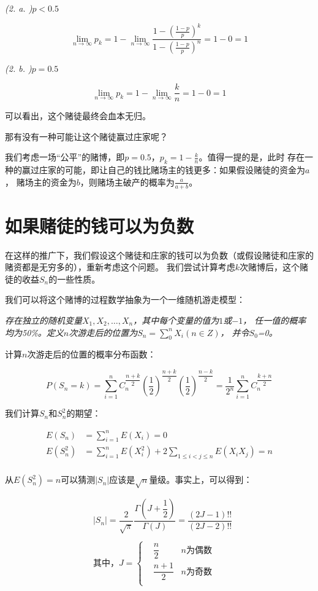 \documentclass{article}
\newcommand\df[2]{\dfrac{#1}{#2}}
\begin{document}
\emph{(2. a. )$p<0.5$}

\emph{$$\lim_{n\to\infty}p_k=1-\lim_{n\to\infty}\frac{1-(\frac{1-p}{p})^k}{1-(\frac{1-p}{p})^n}=1-0=1$$}

\emph{(2. b. )$p=0.5$}

\emph{$$\lim_{n\to\infty}p_k=1-\lim_{n\to\infty}\frac{k}{n}=1-0=1$$}

可以看出，这个赌徒最终会血本无归。

那有没有一种可能让这个赌徒赢过庄家呢？

我们考虑一场“公平”的赌博，即$p=0.5$，$p_k=1-\frac{k}{n}$。值得一提的是，此时
存在一种的赢过庄家的可能，即让自己的钱比赌场主的钱更多：如果假设赌徒的资金为$a$，
赌场主的资金为$b$，则赌场主破产的概率为$\frac{a}{a+b}$。\cite{WikiRW}

\section{如果赌徒的钱可以为负数}

在这样的推广下，我们假设这个赌徒和庄家的钱可以为负数（或假设赌徒和庄家的赌资都是无穷多的），重新考虑这个问题。
我们尝试计算考虑$k$次赌博后，这个赌徒的收益$S_n$的一些性质。

我们可以将这个赌博的过程数学抽象为一个一维随机游走模型：

\emph{存在独立的随机变量$X_1,X_2,\dots,X_n$，其中每个变量的值为$1$或$-1$，
任一值的概率均为50\%。定义$n$次游走后的位置为$S_n=\sum_{0}^{n}X_i(n\in Z)$，
并令$S_0$=0。}

计算$n$次游走后的位置的概率分布函数：

$$P(S_n=k)=\sum_{i=1}^{n}C_{n}^{\df{n+k}{2}}\left(\df{1}{2}\right)^{\df{n+k}{2}}\left(\df{1}{2}\right)^{\df{n-k}{2}}=\df{1}{2^n}\sum_{i=1}^{n}C_{n}^{\df{k+n}{2}}$$

我们计算$S_n$和$S_n^2$的期望：

\begin{equation*}
    \begin{aligned}
        E(S_n) & =\sum_{i=1}^{n}E(X_i)=0\\
        E(S_n^2) & =\sum_{i=1}^{n}E(X_i^2)+2\sum_{1\leq i<j\leq n}^{}E(X_iX_j)=n\\
    \end{aligned}
\end{equation*}

从$E(S_n^2)=n$可以猜测$|S_n|$应该是$\sqrt{n}$量级。事实上，可以得到\cite{RW1D}：

\begin{equation*}
    \begin{aligned}
        & |S_n|=\df{2}{\sqrt{\pi}}\df{\Gamma(J+\df{1}{2})}{\Gamma(J)}=\df{(2J-1)!!}{(2J-2)!!}\\ \\
        & \text{其中，}J=\left\{
        \begin{aligned}
            & \df{n}{2}\text{\ \ \ \ \ \ \ \ \ }&n \text{为偶数}\\
            & \df{n+1}{2}&n \text{为奇数}\\
        \end{aligned}
        \right.
    \end{aligned}
\end{equation*}
\end{document}

